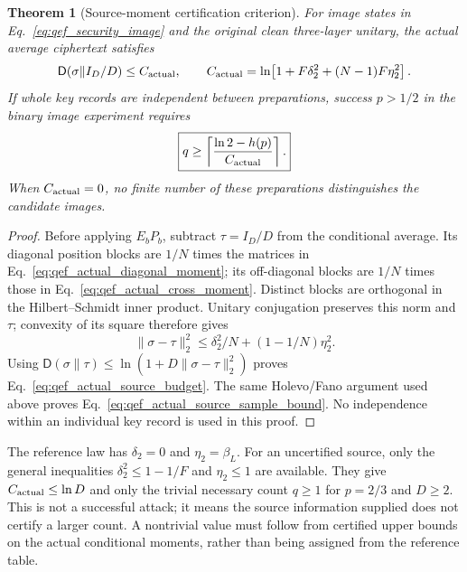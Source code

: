 \documentclass[11pt,a4paper]{article}
\newtheorem{theorem}{Theorem}
\begin{document}
{{\begin{theorem}[Source-moment certification criterion]
\label{thm:qef_actual_source_moments}
For image states in Eq.~\eqref{eq:qef_security_image} and the original
clean three-layer unitary, the actual average ciphertext satisfies
\begin{equation}
 \mathsf D(\sigma\|I_D/D)\leq C_{\rm actual},\qquad
 C_{\rm actual}=\ln\!\left[1+F\delta_2^2+(N-1)F\eta_2^2\right].
 \label{eq:qef_actual_source_budget}
\end{equation}
If whole key records are independent between preparations, success
$p>1/2$ in the binary image experiment requires
\begin{equation}
 \boxed{\displaystyle q\geq
 \left\lceil\frac{\ln2-h(p)}{C_{\rm actual}}\right\rceil.}
 \label{eq:qef_actual_source_sample_bound}
\end{equation}
When $C_{\rm actual}=0$, no finite number of these preparations
distinguishes the candidate images.
\end{theorem}
\begin{proof}
Before applying $E_bP_b$, subtract $\tau=I_D/D$ from the conditional
average. Its diagonal position blocks are $1/N$ times the matrices in
Eq.~\eqref{eq:qef_actual_diagonal_moment}; its off-diagonal blocks are
$1/N$ times those in Eq.~\eqref{eq:qef_actual_cross_moment}.
Distinct blocks are orthogonal in the Hilbert--Schmidt inner product.
Unitary conjugation preserves this norm and $\tau$; convexity of its
square therefore gives
\begin{equation}
 \|\sigma-\tau\|_2^2
 \leq\delta_2^2/N+(1-1/N)\eta_2^2.
\end{equation}
Using $\mathsf D(\sigma\|\tau)\leq
\ln(1+D\|\sigma-\tau\|_2^2)$ proves
Eq.~\eqref{eq:qef_actual_source_budget}. The same Holevo/Fano argument
used above proves Eq.~\eqref{eq:qef_actual_source_sample_bound}.
No independence within an individual key record is used in this proof.
\end{proof}

The reference law has $\delta_2=0$ and $\eta_2=\beta_L$.
For an uncertified source, only the general inequalities
$\delta_2^2\leq1-1/F$ and $\eta_2\leq1$ are available. They give
$C_{\rm actual}\leq\ln D$ and only the trivial necessary count
$q\geq1$ for $p=2/3$ and $D\geq2$. This is not a successful attack;
it means the source information supplied does not certify a larger
count. A nontrivial value must follow from certified upper bounds on
the actual conditional moments, rather than being assigned from the
reference table.

}}
\end{document}

